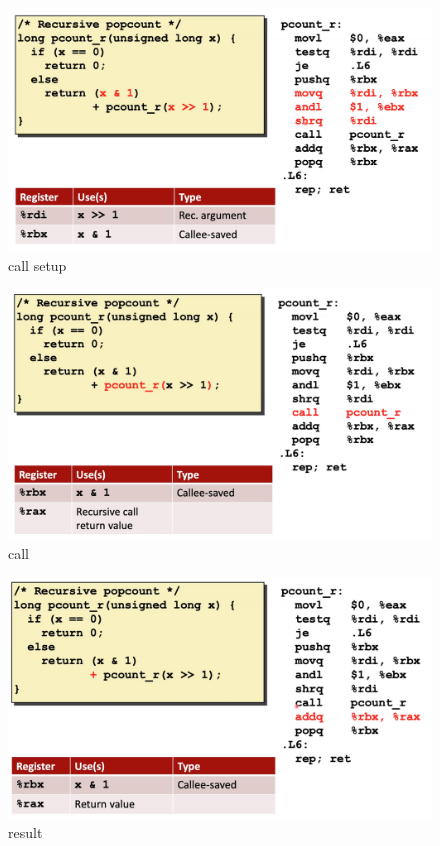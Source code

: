 \documentclass[12pt]{book}
\begin{document}
\begin{figure}
        \centering
        \includegraphics[scale = 0.2]{./figures/rec4}
        \caption{call setup}
\end{figure}

\begin{figure}
        \centering
        \includegraphics[scale = 0.2]{./figures/recOops}
        \caption{call}
\end{figure}

\begin{figure}
        \centering
        \includegraphics[scale = 0.2]{./figures/rec5}
        \caption{result}
\end{figure}
\end{document}
